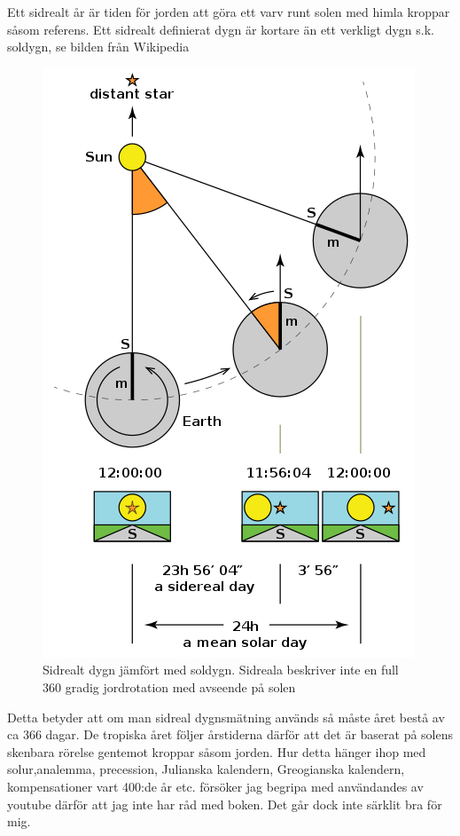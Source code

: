 \documentclass[./exercises.tex]{subfiles}
\begin{document}
\begin{enumerate}
Ett sidrealt år är tiden för jorden att göra ett varv runt solen med himla kroppar såsom referens.
Ett sidrealt definierat dygn är kortare än ett verkligt dygn s.k. soldygn, se bilden från Wikipedia
\begin{figure}[H]
 \includegraphics[width=\linewidth]{sidereal.png}
  \caption{Sidrealt dygn jämfört med soldygn. Sidreala beskriver inte en full 360 gradig jordrotation med avseende på solen}
  \label{fig4}
\end{figure}
Detta betyder att om man sidreal dygnsmätning används så måste året bestå av ca 366 dagar.
De tropiska året följer årstiderna därför att det är baserat på solens skenbara rörelse gentemot kroppar såsom jorden.
Hur detta hänger ihop med solur,analemma, precession, Julianska kalendern, Greogianska kalendern, kompensationer vart 400:de år etc.
försöker jag begripa med användandes av youtube därför att jag inte har råd med boken. Det går dock inte särklit bra för mig.






 

\end{enumerate}
\end{document}
